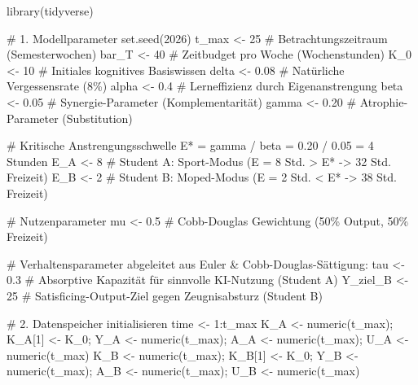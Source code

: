 \documentclass[
  ngerman,
  letterpaper,
  DIV=11]{scrartcl}
\newenvironment{Shaded}{\begin{snugshade}}{\end{snugshade}}
\newcommand{\CommentTok}[1]{\textcolor[rgb]{0.37,0.37,0.37}{#1}}
\newcommand{\DecValTok}[1]{\textcolor[rgb]{0.68,0.00,0.00}{#1}}
\newcommand{\FloatTok}[1]{\textcolor[rgb]{0.68,0.00,0.00}{#1}}
\newcommand{\FunctionTok}[1]{\textcolor[rgb]{0.28,0.35,0.67}{#1}}
\newcommand{\NormalTok}[1]{\textcolor[rgb]{0.00,0.23,0.31}{#1}}
\newcommand{\OtherTok}[1]{\textcolor[rgb]{0.00,0.23,0.31}{#1}}
\newcommand{\SpecialCharTok}[1]{\textcolor[rgb]{0.37,0.37,0.37}{#1}}
\begin{document}
\begin{Shaded}
\begin{Highlighting}[]
\FunctionTok{library}\NormalTok{(tidyverse)}

\CommentTok{\# 1. Modellparameter}
\FunctionTok{set.seed}\NormalTok{(}\DecValTok{2026}\NormalTok{)}
\NormalTok{t\_max }\OtherTok{\textless{}{-}} \DecValTok{25}          \CommentTok{\# Betrachtungszeitraum (Semesterwochen)}
\NormalTok{bar\_T }\OtherTok{\textless{}{-}} \DecValTok{40}          \CommentTok{\# Zeitbudget pro Woche (Wochenstunden)}
\NormalTok{K\_0 }\OtherTok{\textless{}{-}} \DecValTok{10}            \CommentTok{\# Initiales kognitives Basiswissen}
\NormalTok{delta }\OtherTok{\textless{}{-}} \FloatTok{0.08}        \CommentTok{\# Natürliche Vergessensrate (8\%)}
\NormalTok{alpha }\OtherTok{\textless{}{-}} \FloatTok{0.4}         \CommentTok{\# Lerneffizienz durch Eigenanstrengung}
\NormalTok{beta }\OtherTok{\textless{}{-}} \FloatTok{0.05}         \CommentTok{\# Synergie{-}Parameter (Komplementarität)}
\NormalTok{gamma }\OtherTok{\textless{}{-}} \FloatTok{0.20}        \CommentTok{\# Atrophie{-}Parameter (Substitution)}

\CommentTok{\# Kritische Anstrengungsschwelle E* = gamma / beta = 0.20 / 0.05 = 4 Stunden}
\NormalTok{E\_A }\OtherTok{\textless{}{-}} \DecValTok{8}             \CommentTok{\# Student A: Sport{-}Modus (E = 8 Std. \textgreater{} E* {-}\textgreater{} 32 Std. Freizeit)}
\NormalTok{E\_B }\OtherTok{\textless{}{-}} \DecValTok{2}             \CommentTok{\# Student B: Moped{-}Modus (E = 2 Std. \textless{} E* {-}\textgreater{} 38 Std. Freizeit)}

\CommentTok{\# Nutzenparameter}
\NormalTok{mu }\OtherTok{\textless{}{-}} \FloatTok{0.5}            \CommentTok{\# Cobb{-}Douglas Gewichtung (50\% Output, 50\% Freizeit)}

\CommentTok{\# Verhaltensparameter abgeleitet aus Euler \& Cobb{-}Douglas{-}Sättigung:}
\NormalTok{tau }\OtherTok{\textless{}{-}} \FloatTok{0.3}           \CommentTok{\# Absorptive Kapazität für sinnvolle KI{-}Nutzung (Student A)}
\NormalTok{Y\_ziel\_B }\OtherTok{\textless{}{-}} \DecValTok{25}       \CommentTok{\# Satisficing{-}Output{-}Ziel gegen Zeugnisabsturz (Student B)}

\CommentTok{\# 2. Datenspeicher initialisieren}
\NormalTok{time }\OtherTok{\textless{}{-}} \DecValTok{1}\SpecialCharTok{:}\NormalTok{t\_max}
\NormalTok{K\_A }\OtherTok{\textless{}{-}} \FunctionTok{numeric}\NormalTok{(t\_max); K\_A[}\DecValTok{1}\NormalTok{] }\OtherTok{\textless{}{-}}\NormalTok{ K\_0; Y\_A }\OtherTok{\textless{}{-}} \FunctionTok{numeric}\NormalTok{(t\_max); A\_A }\OtherTok{\textless{}{-}} \FunctionTok{numeric}\NormalTok{(t\_max); U\_A }\OtherTok{\textless{}{-}} \FunctionTok{numeric}\NormalTok{(t\_max)}
\NormalTok{K\_B }\OtherTok{\textless{}{-}} \FunctionTok{numeric}\NormalTok{(t\_max); K\_B[}\DecValTok{1}\NormalTok{] }\OtherTok{\textless{}{-}}\NormalTok{ K\_0; Y\_B }\OtherTok{\textless{}{-}} \FunctionTok{numeric}\NormalTok{(t\_max); A\_B }\OtherTok{\textless{}{-}} \FunctionTok{numeric}\NormalTok{(t\_max); U\_B }\OtherTok{\textless{}{-}} \FunctionTok{numeric}\NormalTok{(t\_max)}


\end{Highlighting}
\end{Shaded}
\end{document}
